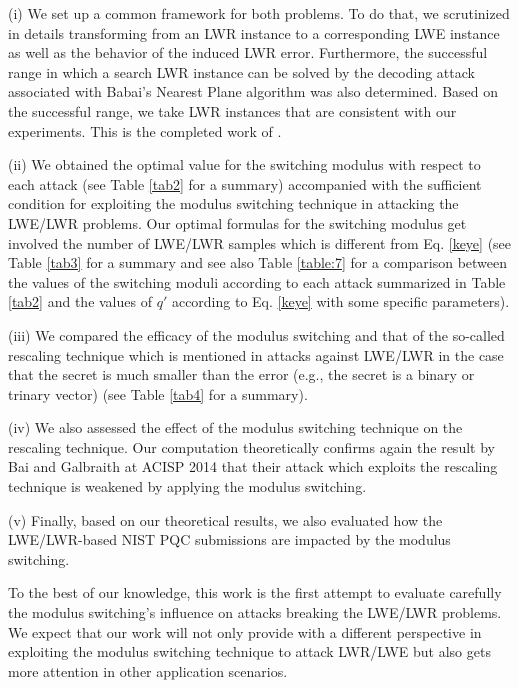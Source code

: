 \documentclass{cta-author}
\begin{document}
	 (i) We set up a common framework for both problems.  To do that, we scrutinized in details transforming from an LWR instance to a corresponding LWE instance as well as the behavior of the induced LWR error. Furthermore, the successful range in which a search LWR instance can be solved by the decoding attack associated with Babai's Nearest Plane algorithm was also determined. Based on the successful range, we take LWR instances that are consistent with our experiments. This is the completed work of \cite{LMDY18}.


	(ii) We obtained the optimal value for the switching modulus with respect to each attack (see Table \ref{tab2} for a summary) accompanied with the sufficient condition for exploiting the modulus switching technique in attacking the LWE/LWR problems. Our optimal formulas for the switching modulus get involved the number of LWE/LWR samples which is different from Eq. \eqref{keye} (see Table \ref{tab3} for a summary and see  also Table \ref{table:7} for a comparison between the values of the switching moduli according to each attack summarized in Table \ref{tab2} and the values of $q'$ according to Eq. \eqref{keye} with some specific parameters). 	


	(iii) We compared the efficacy of the modulus switching and that of the so-called rescaling technique which is mentioned in attacks against LWE/LWR in the case that the secret is much smaller than the error (e.g., the secret is a binary or trinary vector) (see Table \ref{tab4} for a summary).


	(iv) We also assessed the effect of the modulus switching technique on the rescaling technique. Our computation theoretically confirms again the result by Bai and Galbraith at ACISP 2014 \cite{BG14} that their attack which exploits the rescaling technique is weakened by applying the modulus switching. 


	(v) Finally, based on our theoretical results, we also evaluated how the LWE/LWR-based NIST PQC submissions are impacted by the modulus switching.


To the best of our knowledge, this work is the first attempt to evaluate carefully the modulus switching's influence on attacks breaking the LWE/LWR problems. We expect that our work will not only provide with a different perspective in exploiting the modulus switching technique to attack LWR/LWE but also gets more attention in other application scenarios.
\end{document}
